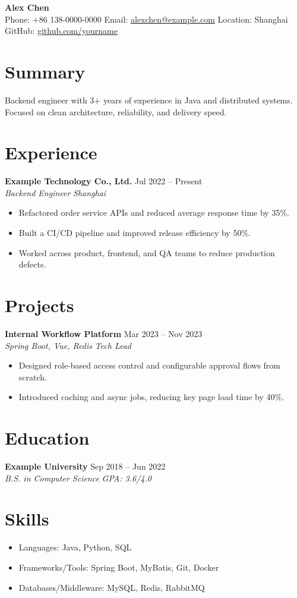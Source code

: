 \documentclass[11pt,a4paper]{article}
\newcommand{\resumeItem}[1]{\item #1}
\newcommand{\resumeHeading}[4]{
  \textbf{#1} \hfill #2 \\
  \textit{#3} \hfill \textit{#4}
}
\begin{document}
{\LARGE \textbf{Alex Chen}} \\
\vspace{4pt}
Phone: +86 138-0000-0000 \quad\textbar\quad Email: \href{mailto:alexchen@example.com}{alexchen@example.com} \quad\textbar\quad Location: Shanghai \\
GitHub: \href{https://github.com/yourname}{github.com/yourname}

\section*{Summary}
Backend engineer with 3+ years of experience in Java and distributed systems. Focused on clean architecture, reliability, and delivery speed.

\section*{Experience}
\resumeHeading{Example Technology Co., Ltd.}{Jul 2022 -- Present}{Backend Engineer}{Shanghai}
\begin{itemize}
  \resumeItem{Refactored order service APIs and reduced average response time by 35\%.}
  \resumeItem{Built a CI/CD pipeline and improved release efficiency by 50\%.}
  \resumeItem{Worked across product, frontend, and QA teams to reduce production defects.}
\end{itemize}

\section*{Projects}
\resumeHeading{Internal Workflow Platform}{Mar 2023 -- Nov 2023}{Spring Boot, Vue, Redis}{Tech Lead}
\begin{itemize}
  \resumeItem{Designed role-based access control and configurable approval flows from scratch.}
  \resumeItem{Introduced caching and async jobs, reducing key page load time by 40\%.}
\end{itemize}

\section*{Education}
\resumeHeading{Example University}{Sep 2018 -- Jun 2022}{B.S. in Computer Science}{GPA: 3.6/4.0}

\section*{Skills}
\begin{itemize}
  \resumeItem{Languages: Java, Python, SQL}
  \resumeItem{Frameworks/Tools: Spring Boot, MyBatis, Git, Docker}
  \resumeItem{Databases/Middleware: MySQL, Redis, RabbitMQ}
\end{itemize}
\end{document}
